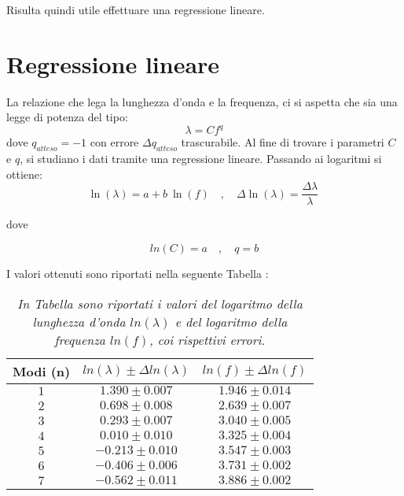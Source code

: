 \documentclass[12pt, a4paper]{article}
\begin{document}
Risulta quindi utile effettuare una regressione lineare.


\section{Regressione lineare}
La relazione che lega la lunghezza d'onda e la frequenza, ci si aspetta che sia una legge di potenza del tipo: 
\begin{equation*}
    \lambda = Cf^{q}
\end{equation*}
dove $q_{atteso}=-1$ con errore $\Delta q_{atteso}$ trascurabile.
Al fine di trovare i parametri $C$ e $q$, si studiano i dati tramite una regressione lineare. Passando ai logaritmi si ottiene:
\begin{equation*}
    \ln{(\lambda)}=a +b\ \ln{(f)} \quad , \quad     \Delta\ln{(\lambda)}=\frac{\Delta \lambda}{\lambda}\ 
\end{equation*}

dove 

\begin{equation*}
    ln(C) = a \quad,\quad q = b 
\end{equation*}

I valori ottenuti sono riportati nella seguente Tabella :


\begin{table}[ht] %
 \centering

\begin{tabular}{|c|c|c|} 
 \hline
  \footnotesize{Modi (n)}& \footnotesize{$ln(\lambda)\pm\Delta ln(\lambda)$ }  & \footnotesize{$ln(f) \pm \Delta ln(f) $ } \\ 
\hline
 $1$ & \footnotesize{$1.390\pm0.007$} & \footnotesize{$1.946\pm0.014$}\\ 
 $2$ & \footnotesize{$0.698\pm0.008$} & \footnotesize{$2.639\pm0.007$} \\
 $3$ & \footnotesize{$0.293\pm0.007$} & \footnotesize{$3.040\pm0.005$} \\
 $4$ & \footnotesize{$0.010\pm0.010$} & \footnotesize{$3.325\pm0.004$} \\
 $5$ & \footnotesize{$-0.213\pm0.010$} & \footnotesize{$3.547\pm0.003$} \\
 $6$ & \footnotesize{$-0.406\pm0.006$} & \footnotesize{$3.731\pm0.002$} \\
 $7$ & \footnotesize{$-0.562\pm0.011$} & \footnotesize{$3.886\pm0.002$} \\
\hline

\end{tabular}\\
\caption{\small{\textit{In Tabella sono riportati i valori del logaritmo della lunghezza d'onda $ln(\lambda)$ e del logaritmo della frequenza $ln(f)$, coi rispettivi errori.} }}
    \label{tab:Logaritmo lunghezza d'onda e frequenza}
\end{table}
\end{document}
